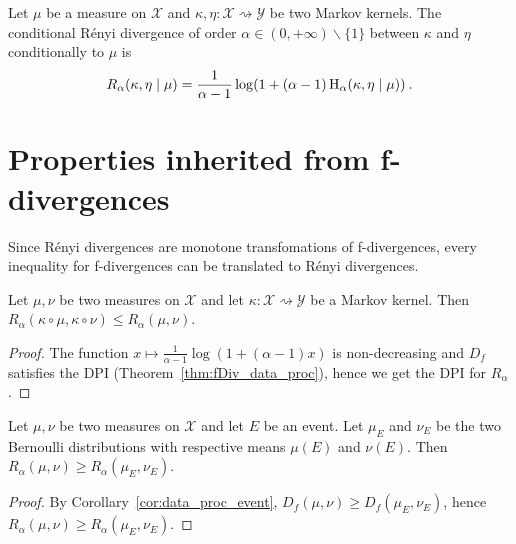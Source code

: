 \begin{definition}
  \label{def:condRenyi}
  Let $\mu$ be a measure on $\mathcal X$ and $\kappa, \eta : \mathcal X \rightsquigarrow \mathcal Y$ be two Markov kernels. The conditional Rényi divergence of order $\alpha \in (0,+\infty) \backslash \{1\}$ between $\kappa$ and $\eta$ conditionally to $\mu$ is
  \begin{align*}
  R_\alpha(\kappa, \eta \mid \mu) =\frac{1}{\alpha - 1} \log (1 + (\alpha - 1) \operatorname{H}_\alpha(\kappa, \eta \mid \mu)) \: .
  \end{align*}
\end{definition}

\section{Properties inherited from f-divergences}

Since Rényi divergences are monotone transfomations of f-divergences, every inequality for f-divergences can be translated to Rényi divergences.

\begin{theorem}
  \label{thm:renyi_data_proc}
  Let $\mu, \nu$ be two measures on $\mathcal X$ and let $\kappa : \mathcal X \rightsquigarrow \mathcal Y$ be a Markov kernel.
  Then $R_\alpha(\kappa \circ \mu, \kappa \circ \nu) \le R_\alpha(\mu, \nu)$.
\end{theorem}

\begin{proof}
The function $x \mapsto \frac{1}{\alpha - 1}\log (1 + (\alpha - 1)x)$ is non-decreasing and $D_f$ satisfies the DPI (Theorem~\ref{thm:fDiv_data_proc}), hence we get the DPI for $R_\alpha$.
\end{proof}

\begin{lemma}
  \label{lem:renyi_data_proc_event}
  Let $\mu, \nu$ be two measures on $\mathcal X$ and let $E$ be an event. Let $\mu_E$ and $\nu_E$ be the two Bernoulli distributions with respective means $\mu(E)$ and $\nu(E)$.
  Then $R_\alpha(\mu, \nu) \ge R_\alpha(\mu_E, \nu_E)$.
\end{lemma}

\begin{proof}
By Corollary~\ref{cor:data_proc_event}, $D_f(\mu, \nu) \ge D_f(\mu_E, \nu_E)$, hence $R_\alpha(\mu, \nu) \ge R_\alpha(\mu_E, \nu_E)$.
\end{proof}

